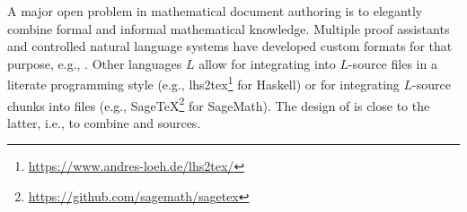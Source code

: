 
A major open problem in mathematical document authoring is to elegantly combine formal and informal mathematical knowledge.
Multiple proof assistants and controlled natural language systems have developed custom formats for that purpose, e.g., \cite{isabelle_documentoriented,mizar,plato,naproche}.
Other languages $L$ allow for integrating \latex into $L$-source files in a literate programming style (e.g., lhs2tex\footnote{\url{https://www.andres-loeh.de/lhs2tex/}} for Haskell) or for integrating $L$-source chunks into \latex files (e.g., SageTeX\footnote{\url{https://github.com/sagemath/sagetex}} for SageMath).
The design of \mmttex is close to the latter, i.e., to combine \mmt and \latex sources.




